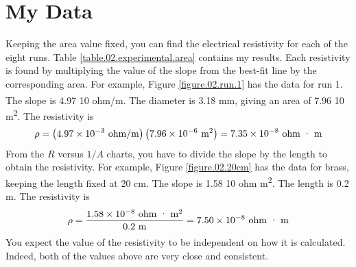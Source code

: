 \section{My Data}
%
Keeping the area value fixed, you can find the electrical resistivity for each of the eight runs. Table \ref{table.02.experimental.area} contains my results. Each resistivity is found by multiplying the value of the slope from the best-fit line by the corresponding area. For example, Figure \ref{figure.02.run.1} has the data for run 1. The slope is 4.97 {\texttimes} 10\textsuperscript{} ohm/m. The diameter is 3.18 mm, giving an area of 7.96 {\texttimes} 10\textsuperscript{} m\textsuperscript{2}. The resistivity is
\begin{equation}
	\rho = \left(4.97 \times 10^{-3} \ \text{ohm/m}\right) \left(7.96 \times 10^{-6} \ \text{m}^{2}\right) = 7.35 \times 10^{-8} \ \text{ohm {\textperiodcentered} m}
\end{equation}
From the $R$ versus $1/A$ charts, you have to divide the slope by the length to obtain the resistivity. For example, Figure \ref{figure.02.20cm} has the data for brass, keeping the length fixed at 20 cm. The slope is 1.58 {\texttimes} 10\textsuperscript{} ohm {\textperiodcentered} m\textsuperscript{2}. The length is 0.2 m. The resistivity is
\begin{equation}
	\rho = \frac{1.58 \times 10^{-8} \ \text{ohm {\textperiodcentered} m\textsuperscript{2}}}{0.2 \ \text{m}} = 7.50 \times 10^{-8} \ \text{ohm {\textperiodcentered} m}
\end{equation}
You expect the value of the resistivity to be independent on how it is calculated. Indeed, both of the values above are very close and consistent.
%
